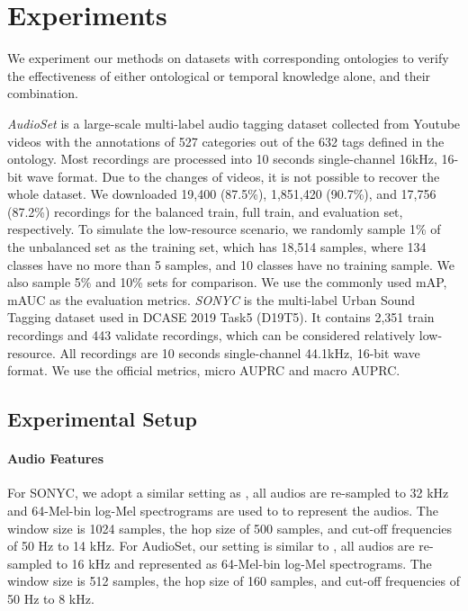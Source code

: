 \section{Experiments}
\label{sec:experiments}


We experiment our methods on datasets with corresponding ontologies to verify the effectiveness of either ontological or temporal knowledge alone, and their combination.

\textit{AudioSet} is a large-scale multi-label audio tagging dataset collected from Youtube videos with the annotations of 527 categories out of the 632 tags defined in the ontology. Most recordings are processed into 10 seconds single-channel 16kHz, 16-bit wave format. Due to the changes of videos, it is not possible to recover the whole dataset. We downloaded 19,400 (87.5\%), 1,851,420 (90.7\%), and 17,756 (87.2\%) recordings for the balanced train, full train, and evaluation set, respectively. To simulate the low-resource scenario, we randomly sample 1\% of the unbalanced set as the training set, which has 18,514 samples, where 134 classes have no more than 5 samples, and 10 classes have no training sample. We also sample 5\% and 10\% sets for comparison. We use the commonly used mAP, mAUC as the evaluation metrics. 
\textit{SONYC} is the multi-label Urban Sound Tagging dataset used in DCASE 2019 Task5 (D19T5). It contains 2,351 train recordings and 443 validate recordings, which can be considered relatively low-resource. All recordings are 10 seconds single-channel 44.1kHz, 16-bit wave format. We use the official metrics, micro AUPRC and macro AUPRC.

\subsection{Experimental Setup}

\paragraph{Audio Features} For SONYC, we adopt a similar setting as \citep{kong2019cross}, all audios are re-sampled to 32 kHz and 64-Mel-bin log-Mel spectrograms are used to to represent the audios. The window size is 1024 samples, the hop size of 500 samples, and cut-off frequencies of 50 Hz to 14 kHz. 
For AudioSet, our setting is similar to \citep{kong2020panns}, all audios are re-sampled to 16 kHz and represented as 64-Mel-bin log-Mel spectrograms. The window size is 512 samples, the hop size of 160 samples, and cut-off frequencies of 50 Hz to 8 kHz.

